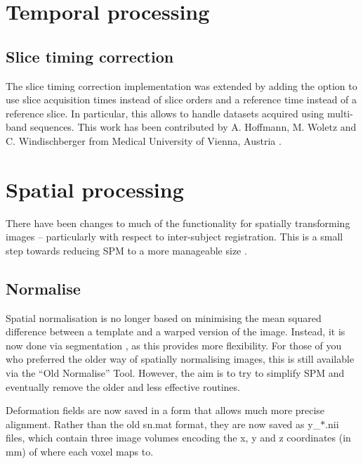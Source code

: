 \documentclass[a4paper,titlepage,openany]{article}
\begin{document}

\vspace{10mm}
\begin{multicols}{2}

\section{Temporal processing}

\subsection{Slice timing correction}

The slice timing correction implementation was extended by adding the option to use slice acquisition times instead of slice orders and a reference time instead of a reference slice. In particular, this allows to handle datasets acquired using multi-band sequences. This work has been contributed by A. Hoffmann, M. Woletz and C. Windischberger from Medical University of Vienna, Austria \cite{woletz2014st}.

\section{Spatial processing}
There have been changes to much of the functionality for spatially transforming images -- particularly with respect to inter-subject registration.
This is a small step towards reducing SPM to a more manageable size \cite{ashburner2011spm}.

\subsection{Normalise}
Spatial normalisation is no longer based on minimising the mean squared difference between a template and a warped version of the image.
Instead, it is now done via segmentation \cite{ashburner05}, as this provides more flexibility.
For those of you who preferred the older way of spatially normalising images, this is still available via the ``Old Normalise'' Tool.
However, the aim is to try to simplify SPM and eventually remove the older and less effective \cite{klein_evaluation} routines.

Deformation fields are now saved in a form that allows much more precise alignment.
Rather than the old sn.mat format, they are now saved as y\_$*$.nii files, which contain three image volumes encoding the x, y and z coordinates (in mm) of where each voxel maps to.


\end{multicols}
\end{document}
